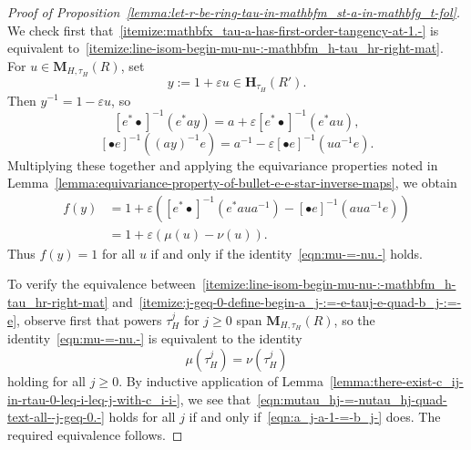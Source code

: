 \documentclass[reqno]{amsart}
\def\eps{\varepsilon}
\theoremstyle{plain} \newtheorem{theorem} {Theorem} \newtheorem{conjecture} {Conjecture} \newtheorem{corollary} [theorem] {Corollary} \newtheorem{proposition} [theorem] {Proposition} \newtheorem{fact} [theorem] {Fact}
\theoremstyle{definition} \newtheorem{definition} [theorem] {Definition}
\theoremstyle{itplain} %
\begin{document}
\begin{proof}[Proof of Proposition~\ref{lemma:let-r-be-ring-tau-in-mathbfm_st-a-in-mathbfg_t-fol}]
  We check first that~\eqref{itemize:mathbfx_tau-a-has-first-order-tangency-at-1.-} is equivalent to~\eqref{itemize:line-isom-begin-mu-nu-:-mathbfm_h-tau_hr-right-mat}.  For $u \in \mathbf{M}_{H,\tau_H}(R)$, set
  \begin{equation*}
    y := 1 + \eps u \in \mathbf{H}_{\tau_H}(R').
  \end{equation*}
  Then $y^{-1} = 1 - \eps u$, so
  \begin{equation*} {[e^* \bullet]}^{-1}(e^* a y) = a + \eps {[e^* \bullet]}^{-1}(e^* a u),
  \end{equation*}
  \begin{equation*} {[\bullet e]}^{-1} ( {(a y ) }^{-1} e) = a^{-1} - \eps {[\bullet e]}^{-1} ( u a^{-1} e).
  \end{equation*}
  Multiplying these together and applying the equivariance properties noted in Lemma~\ref{lemma:equivariance-property-of-bullet-e-e-star-inverse-maps}, we obtain
  \begin{align*}
    f(y) &= 1 + \eps \left(
           {[e^* \bullet]}^{-1}(e^* a u a^{-1})
           - 
           {[\bullet e]}^{-1}(a u a ^{-1} e)
           \right) \\
         &= 1 + \eps \left( \mu(u) - \nu(u) \right).
  \end{align*}
  Thus $f(y) = 1$ for all $u$ if and only if the identity~\eqref{eqn:mu-=-nu.-} holds.

  To verify the equivalence between~\eqref{itemize:line-isom-begin-mu-nu-:-mathbfm_h-tau_hr-right-mat} and~\eqref{itemize:j-geq-0-define-begin-a_j-:=-e-tauj-e-quad-b_j-:=-e}, observe first that powers $\tau_H^j$ for $j \geq 0$ span $\mathbf{M}_{H,\tau_H}(R)$, so the identity~\eqref{eqn:mu-=-nu.-} is equivalent to the identity
  \begin{equation}\label{eqn:mutau_hj-=-nutau_hj-quad-text-all--j-geq-0.-}
    \mu(\tau_H^j) = \nu(\tau_H^j)
  \end{equation}
  holding for all $j \geq 0$.  By inductive application of Lemma~\ref{lemma:there-exist-c_ij-in-rtau-0-leq-i-leq-j-with-c_i-i-}, we see that~\eqref{eqn:mutau_hj-=-nutau_hj-quad-text-all--j-geq-0.-} holds for all $j$ if and only if~\eqref{eqn:a_j-a-1-=-b_j-} does.  The required equivalence follows.


\end{proof}
\end{document}
